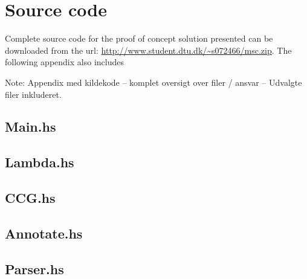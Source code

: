 \newcommand{\source}{../Code/CC}
\chapter{Source code}
\label{chap:source}

Complete source code for the proof of concept solution presented can be downloaded from the url: \url{http://www.student.dtu.dk/~s072466/msc.zip}. The following appendix also includes 


Note: Appendix med kildekode -- komplet oversigt over filer / ansvar -- Udvalgte filer inkluderet.


\section*{Main.hs}


\section*{Lambda.hs}


\section*{CCG.hs}


\section*{Annotate.hs}


\section*{Parser.hs}



